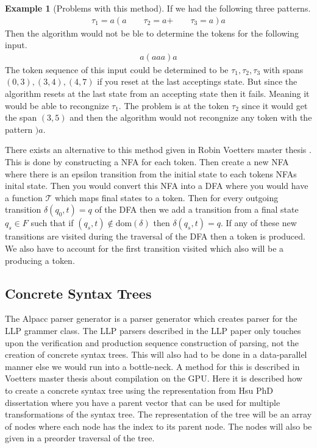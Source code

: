 \documentclass[a4paper,12pt]{article}
\theoremstyle{definition}
\newtheorem{example}{Example}[section]
\begin{document}
\begin{example}[Problems with this method]\label{ex:overlap}
  If we had the following three patterns.
  \begin{align*}
    \tau_1 = a(a \qquad \tau_2 = a\text{+} \qquad \tau_3 = a)a
  \end{align*}
  Then the algorithm would not be ble to determine the tokens for the following input.
  \begin{align*}
    a(aaa)a
  \end{align*}
  The token sequence of this input could be determined to be $\tau_1, \tau_2, \tau_3$ with spans $(0, 3), (3, 4), (4, 7)$ if you reset at the last acceptings state. But since the algorithm resets at the last state from an accepting state then it fails. Meaning it would be able to recongnize $\tau_1$. The problem is at the token $\tau_2$ since it would get the span $(3, 5)$ and then the algorithm would not recongnize any token with the pattern $)a$.
\end{example}
\noindent There exists an alternative to this method given in Robin Voetters master thesis \cite[13-16]{voetter2021}. This is done by constructing a NFA for each token. Then create a new NFA where there is an epsilon transition from the initial state to each tokens NFAs inital state. Then you would convert this NFA into a DFA where you would have a function $\mathcal{T}$ which maps final states to a token. Then for every outgoing transition $\delta(q_0, t) = q$ of the DFA then we add a transition from a final state $q_s \in F$ such that if $(q_s, t) \notin \text{dom}(\delta)$ then $\delta(q_s, t) = q$. If any of these new transitions are visited during the traversal of the DFA then a token is produced. We also have to account for the first transition visited which also will be a producing a token.

\subsection{Concrete Syntax Trees}
The Alpacc parser generator is a parser generator which creates parser for the LLP grammer class. The LLP parsers described in the LLP paper \cite{Vagner2007} only touches upon the verification and production sequence construction of parsing, not the creation of concrete syntax trees. This will also had to be done in a data-parallel manner else we would run into a bottle-neck. A method for this is described in Voetters master thesis \cite[32-33]{voetter2021} about compilation on the GPU. Here it is described how to create a concrete syntax tree using the representation from Hsu PhD dissertation \cite[77-81]{hsu2019} where you have a parent vector that can be used for multiple transformations of the syntax tree. The representation of the tree will be an array of nodes where each node has the index to its parent node. The nodes will also be given in a preorder traversal of the tree.
\end{document}
